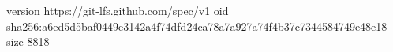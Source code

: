 version https://git-lfs.github.com/spec/v1
oid sha256:a6ed5d5baf0449e3142a4f74dfd24ca78a7a927a74f4b37c7344584749e48e18
size 8818
